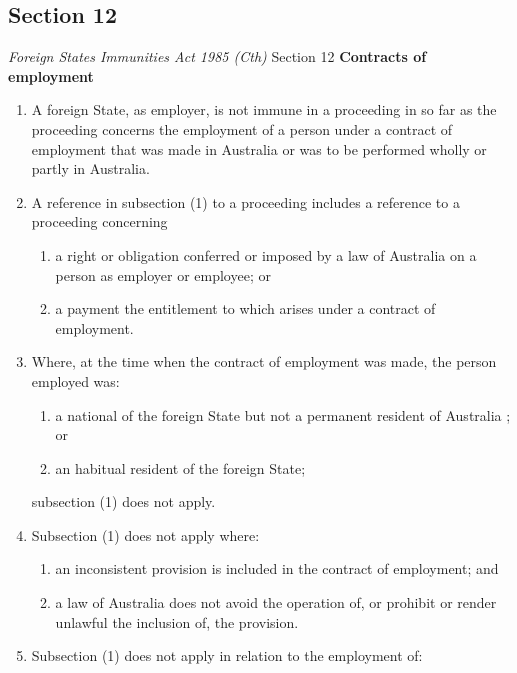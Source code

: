 \subsection{Section 12}
\begin{statutedetails}{\textit{Foreign States Immunities Act 1985 (Cth)} Section 12}
    \flushleft
    \textbf{Contracts of employment}

    \begin{enumerate}[label=(\arabic*)]
        \item A foreign State, as employer, is not immune in a proceeding in so far as the proceeding concerns the employment of a person under a contract of employment that was made in Australia or was to be performed wholly or partly in Australia.
        \item A reference in subsection (1) to a proceeding includes a reference to a proceeding concerning
        \begin{enumerate}[label=(\alph*)]
            \item a right or obligation conferred or imposed by a law of Australia on a person as employer or employee; or
            \item a payment the entitlement to which arises under a contract of employment.
        \end{enumerate}
        \item Where, at the time when the contract of employment was made, the person employed was:
        \begin{enumerate}[label=(\alph*)]
            \item a national of the foreign State but not a permanent resident of Australia ; or
            \item an habitual resident of the foreign State;
        \end{enumerate}
        subsection (1) does not apply.
        \item Subsection (1) does not apply where:
        \begin{enumerate}[label=(\alph*)]
            \item an inconsistent provision is included in the contract of employment; and
            \item a law of Australia does not avoid the operation of, or prohibit or render unlawful the inclusion of, the provision.
        \end{enumerate}
        \item Subsection (1) does not apply in relation to the employment of:
        \begin{enumerate}

\end{enumerate}
\end{enumerate}
\end{statutedetails}
